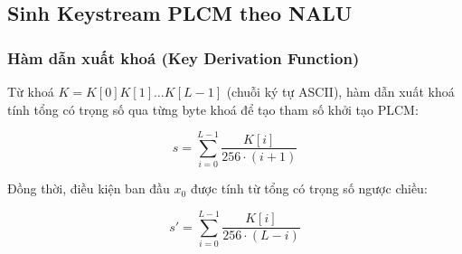 \subsection{Sinh Keystream PLCM theo NALU}

\subsubsection{Hàm dẫn xuất khoá (Key Derivation Function)}

Từ khoá $K = K[0]K[1]\ldots K[L-1]$ (chuỗi ký tự ASCII), hàm dẫn xuất khoá tính tổng có trọng số qua từng byte khoá để tạo tham số khởi tạo PLCM:

\begin{equation}
s = \sum_{i=0}^{L-1} \frac{K[i]}{256 \cdot (i+1)}
\label{eq:kdf}
\end{equation}

Đồng thời, điều kiện ban đầu $x_0$ được tính từ tổng có trọng số ngược chiều:

\begin{equation}
s' = \sum_{i=0}^{L-1} \frac{K[i]}{256 \cdot (L-i)}
\label{eq:kdf_ic}
\end{equation}

